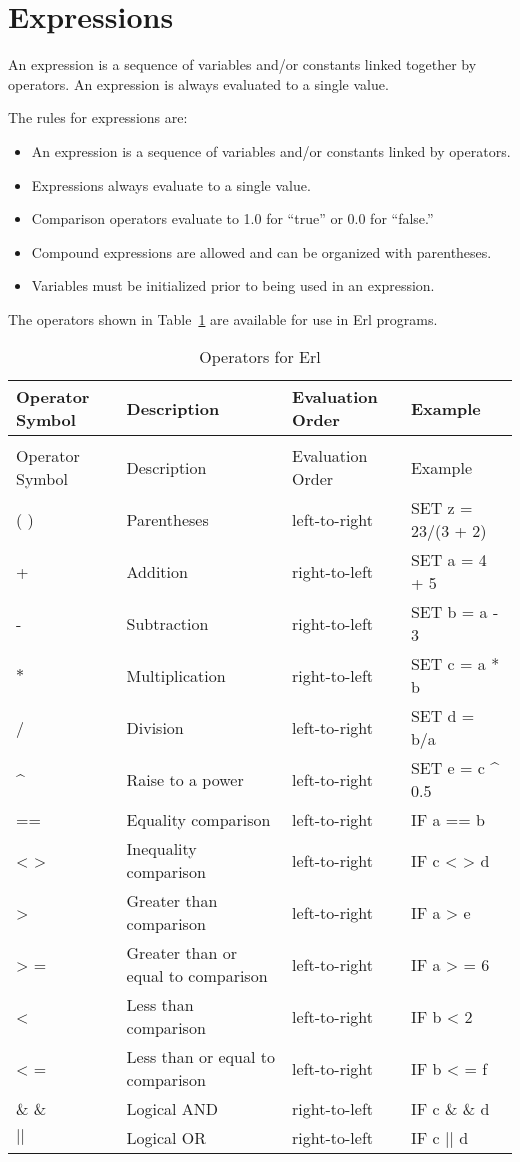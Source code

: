 \section{Expressions}\label{expressions}

An expression is a sequence of variables and/or constants linked together by operators. An expression is always evaluated to a single value.

The rules for expressions are:

\begin{itemize}
\item
  An expression is a sequence of variables and/or constants linked by operators.
\item
  Expressions always evaluate to a single value.
\item
  Comparison operators evaluate to 1.0 for ``true'' or 0.0 for ``false.''
\item
  Compound expressions are allowed and can be organized with parentheses.
\item
  Variables must be initialized prior to being used in an expression.
\end{itemize}

The operators shown in Table~\ref{table:operators-for-erl} are available for use in Erl programs.

\begin{longtable}[c]{p{1.5in}p{1.5in}p{1.5in}p{1.5in}}
\caption{Operators for Erl \label{table:operators-for-erl}} \tabularnewline
\toprule 
Operator Symbol & Description & Evaluation Order & Example \tabularnewline
\midrule
\endfirsthead

\caption[]{Operators for Erl} \tabularnewline
\toprule 
Operator Symbol & Description & Evaluation Order & Example \tabularnewline
\midrule
\endhead

( ) & Parentheses & left-to-right & SET z = 23/(3 + 2) \tabularnewline
+ & Addition & right-to-left & SET a = 4 + 5 \tabularnewline
- & Subtraction & right-to-left & SET b = a - 3 \tabularnewline
${\ast}$ & Multiplication & right-to-left & SET c = a * b \tabularnewline
/ & Division & left-to-right & SET d = b/a \tabularnewline
\^{} & Raise to a power & left-to-right & SET e = c \^{} 0.5 \tabularnewline
== & Equality comparison & left-to-right & IF a == b \tabularnewline
< > ~ & Inequality comparison & left-to-right & IF c  < >  d \tabularnewline
> ~ & Greater than comparison & left-to-right & IF a  >  e \tabularnewline
> = & Greater than or equal to comparison & left-to-right & IF a  > = 6 \tabularnewline
< ~ & Less than comparison & left-to-right & IF b  <  2 \tabularnewline
< = & Less than or equal to comparison & left-to-right & IF b  < = f \tabularnewline
\& \& & Logical AND & right-to-left & IF c  \& \&  d \tabularnewline
${\vert}{\vert}$ & Logical OR & right-to-left & IF c ${\vert}{\vert}$ d \tabularnewline
\bottomrule
\end{longtable}

